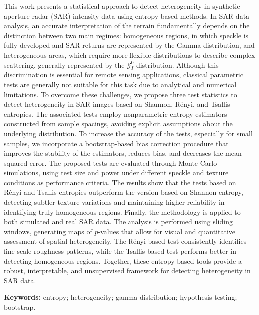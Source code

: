 
This work presents a statistical approach to detect heterogeneity 
in synthetic aperture radar (SAR) intensity data using entropy-based methods.
In SAR data analysis, an accurate interpretation of the terrain fundamentally 
depends on the distinction between two main regimes: homogeneous regions, in which 
speckle is fully developed and SAR returns are represented by the Gamma distribution, 
and heterogeneous areas, which require more flexible distributions to describe complex scattering, 
generally represented by the $\mathcal{G}_I^0$ distribution.
Although this discrimination is essential for remote sensing applications, 
classical parametric tests are generally not suitable for this task due to analytical and numerical limitations.
To overcome these challenges, we propose three test statistics to detect heterogeneity in SAR images based on 
Shannon, Rényi, and Tsallis entropies. 
The associated tests employ nonparametric entropy estimators constructed from sample spacings, avoiding explicit 
assumptions about the underlying distribution. To increase the accuracy of the tests, especially for small samples, 
we incorporate a bootstrap-based bias correction procedure that improves the stability of the estimators, reduces bias, 
and decreases the mean squared error.
The proposed tests are evaluated through Monte Carlo simulations, using test size and power under different speckle 
and texture conditions as performance criteria.
The results show that the tests based on Rényi and Tsallis entropies outperform the version based on Shannon entropy, 
detecting subtler texture variations and maintaining higher reliability in identifying truly homogeneous regions.
Finally, the methodology is applied to both simulated and real SAR data.
The analysis is performed using sliding windows, generating maps of $p$-values that allow for visual 
and quantitative assessment of spatial heterogeneity. 
The Rényi-based test consistently identifies fine-scale roughness patterns, while the Tsallis-based test performs better in detecting homogeneous regions. 
Together, these entropy-based tools provide a robust, interpretable, and unsupervised framework for detecting heterogeneity in SAR data.

\vspace{1em}
\par
\noindent \textbf{Keywords:}  entropy;  heterogeneity; gamma distribution; hypothesis testing; bootstrap.





